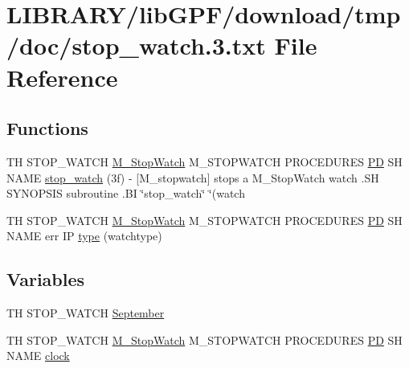 \hypertarget{stop__watch_83_8txt}{}\section{L\+I\+B\+R\+A\+R\+Y/lib\+G\+P\+F/download/tmp/doc/stop\+\_\+watch.3.txt File Reference}
\label{stop__watch_83_8txt}
\subsection*{Functions}
\begin{DoxyCompactItemize}
\item 
TH S\+T\+O\+P\+\_\+\+W\+A\+T\+CH \hyperlink{option__stopwatch_83_8txt_aa2011fc45a5e502e87ee50996a8a9305}{M\+\_\+\+Stop\+Watch} M\+\_\+\+S\+T\+O\+P\+W\+A\+T\+CH P\+R\+O\+C\+E\+D\+U\+R\+ES \hyperlink{what__overview_81_8txt_a85f26da5a4481fbdb0d9c79f2b94de3e}{PD} SH N\+A\+ME \hyperlink{stop__watch_83_8txt_a6c6e2d89b31d43f474ee6a56e1330368}{stop\+\_\+watch} (3f) -\/ \mbox{[}\+M\+\_\+stopwatch\mbox{]} stops a M\+\_\+\+Stop\+Watch watch .\+S\+H S\+Y\+N\+O\+P\+S\+I\+S subroutine .\+B\+I \char`\"{}stop\+\_\+watch\char`\"{} \char`\"{}(watch
\item 
TH S\+T\+O\+P\+\_\+\+W\+A\+T\+CH \hyperlink{option__stopwatch_83_8txt_aa2011fc45a5e502e87ee50996a8a9305}{M\+\_\+\+Stop\+Watch} M\+\_\+\+S\+T\+O\+P\+W\+A\+T\+CH P\+R\+O\+C\+E\+D\+U\+R\+ES \hyperlink{what__overview_81_8txt_a85f26da5a4481fbdb0d9c79f2b94de3e}{PD} SH N\+A\+ME err IP \hyperlink{stop__watch_83_8txt_a70f0ead91c32e25323c03265aa302c1c}{type} (watchtype)
\end{DoxyCompactItemize}
\subsection*{Variables}
\begin{DoxyCompactItemize}
\item 
TH S\+T\+O\+P\+\_\+\+W\+A\+T\+CH \hyperlink{stop__watch_83_8txt_a1d05d9f5f870208fd0790859b520508a}{September}
\item 
TH S\+T\+O\+P\+\_\+\+W\+A\+T\+CH \hyperlink{option__stopwatch_83_8txt_aa2011fc45a5e502e87ee50996a8a9305}{M\+\_\+\+Stop\+Watch} M\+\_\+\+S\+T\+O\+P\+W\+A\+T\+CH P\+R\+O\+C\+E\+D\+U\+R\+ES \hyperlink{what__overview_81_8txt_a85f26da5a4481fbdb0d9c79f2b94de3e}{PD} SH N\+A\+ME \hyperlink{stop__watch_83_8txt_a148c035b430d6edf5413dbd2704facfb}{clock}
\end{DoxyCompactItemize}


